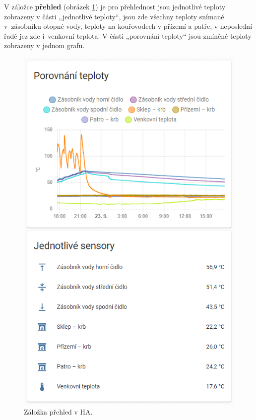 V záložce \textbf{přehled} (obrázek \ref{fig:zalozka-prehled}) je pro přehlednost jsou jednotlivé teploty zobrazeny v části „jednotlivé teploty“, jsou zde všechny teploty snímané v~zásobníku otopné vody, teploty na kouřovodech v přízemí a patře, v neposlední řadě jez zde i~venkovní teplota. V části „porovnání teploty“ jsou zmíněné teploty zobrazeny v jednom grafu.

\begin{figure}[H]
    \centering
    \includegraphics[width=\textwidth]{images/software-ha/zalozka-prehled.png}
    \caption{Záložka přehled v HA.}
    \label{fig:zalozka-prehled}
\end{figure}

